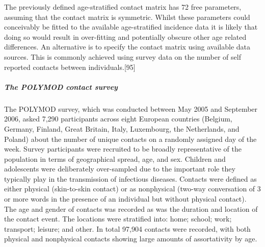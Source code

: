 \documentclass[11pt,twoside]{bristolthesis}
\begin{document}
  The previously defined age-stratified contact matrix has 72 free parameters, assuming that the contact matrix is symmetric. Whilst these parameters could conceivably be fitted to the available age-stratified incidence data it is likely that doing so would result in over-fitting and potentially obscure other age related differences. An alternative is to specify the contact matrix using available data sources. This is commonly achieved using survey data on the number of self reported contacts between individuals.{[}95{]}
  
  \hypertarget{the-polymod-contact-survey}{%
  \subparagraph{The POLYMOD contact survey}\label{the-polymod-contact-survey}}
  
  The POLYMOD survey, which was conducted between May 2005 and September 2006, asked 7,290 participants across eight European countries (Belgium, Germany, Finland, Great Britain, Italy, Luxembourg, the Netherlands, and Poland) about the number of unique contacts on a randomly assigned day of the week. Survey participants were recruited to be broadly representative of the population in terms of geographical spread, age, and sex. Children and adolescents were deliberately over-sampled due to the important role they typically play in the transmission of infectious diseases. Contacts were defined as either physical (skin-to-skin contact) or as nonphysical (two-way conversation of 3 or more words in the presence of an individual but without physical contact). The age and gender of contacts was recorded as was the duration and location of the contact event. The locations were stratified into: home; school; work; transport; leisure; and other. In total 97,904 contacts were recorded, with both physical and nonphysical contacts showing large amounts of assortativity by age.
  
\end{document}
